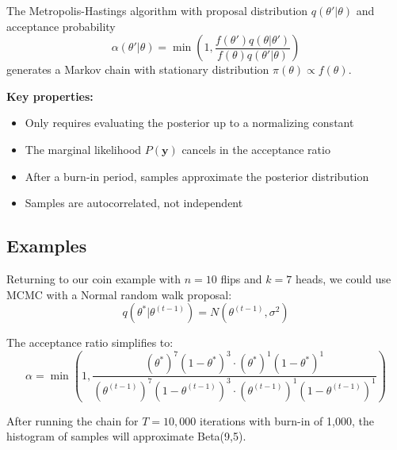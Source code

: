 \begin{theorem}\label{thm:metropolis_hastings}
The Metropolis-Hastings algorithm with proposal distribution $q(\theta'|\theta)$ and acceptance probability
$$\alpha(\theta'|\theta) = \min\left(1, \frac{f(\theta') q(\theta|\theta')}{f(\theta) q(\theta'|\theta)}\right)$$
generates a Markov chain with stationary distribution $\pi(\theta) \propto f(\theta)$.
\end{theorem}

\textbf{Key properties:}
\begin{itemize}
\item Only requires evaluating the posterior up to a normalizing constant
\item The marginal likelihood $P(\mathbf{y})$ cancels in the acceptance ratio
\item After a burn-in period, samples approximate the posterior distribution
\item Samples are autocorrelated, not independent
\end{itemize}

\subsection{Examples}
\begin{examplebox}
\begin{example}
Returning to our coin example with $n=10$ flips and $k=7$ heads, we could use MCMC with a Normal random walk proposal:
$$q(\theta^*|\theta^{(t-1)}) = N(\theta^{(t-1)}, \sigma^2)$$

The acceptance ratio simplifies to:
$$\alpha = \min\left(1, \frac{(\theta^*)^7(1-\theta^*)^3 \cdot (\theta^*)^{1}(1-\theta^*)^{1}}{(\theta^{(t-1)})^7(1-\theta^{(t-1)})^3 \cdot (\theta^{(t-1)})^{1}(1-\theta^{(t-1)})^{1}}\right)$$

After running the chain for $T=10{,}000$ iterations with burn-in of 1,000, the histogram of samples will approximate Beta(9,5).
\end{example}
\end{examplebox}

